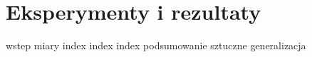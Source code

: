 \newcommand*{\resultssummary}[1]{
  Rezultaty oznaczają, że sieć rozważana w tym punkcie rozpoznaje poprawnie średnio \textbf{#1\%} pikseli na obrazie.
}
\newcommand{\resultsoriginal}{bazowej implementacji sieci \textit{Mask R-CNN}}
\newcommand{\resultsmodified}{zmodyfikowanej implementacji sieci \textit{Mask R-CNN}}
\newcommand{\withgenerated}{, wzbogaconym o sztucznie wygenerowane obrazy treningowe}
\newcommand*{\resultsintro}[3]{W tym punkcie przedstawiono rezultaty #1, trenowanej na zbiorze danych \textit{#2}#3.}

\chapter{Eksperymenty i rezultaty}

{wstep}
{miary}
{index}
{index}
\newpage
{index}
\newpage
{podsumowanie}
{sztuczne}
{generalizacja}
